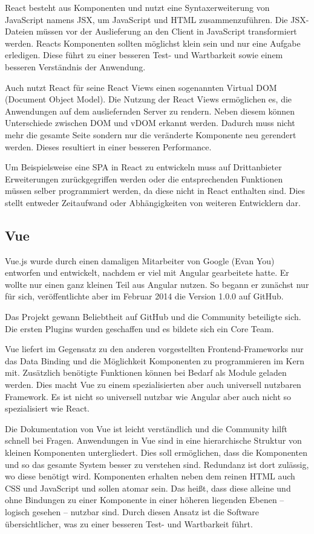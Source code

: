 React besteht aus Komponenten und nutzt eine Syntaxerweiterung von JavaScript namens JSX, um JavaScript und HTML zusammenzuführen. Die JSX-Dateien müssen vor der Auslieferung  an den Client in JavaScript transformiert werden. Reacts Komponenten sollten möglichst klein sein und nur eine Aufgabe erledigen. Diese führt zu einer besseren Test- und Wartbarkeit sowie einem besseren Verständnis der Anwendung. \cite{bezJavaScriptEinfuehrungReact2015}

Auch nutzt React für seine React Views einen sogenannten Virtual DOM (Document Object Model). Die Nutzung der React Views ermöglichen es, die Anwendungen auf dem ausliefernden Server zu rendern. Neben diesem können Unterschiede zwischen DOM und vDOM erkannt werden. Dadurch muss nicht mehr die gesamte Seite sondern nur die veränderte Komponente neu gerendert werden. Dieses resultiert in einer besseren Performance. \cite{bezJavaScriptEinfuehrungReact2015}

Um Beispielsweise eine SPA in React zu entwickeln muss auf Drittanbieter Erweiterungen zurückgegriffen werden oder die entsprechenden Funktionen müssen selber programmiert werden, da diese nicht in React enthalten sind. Dies stellt entweder Zeitaufwand oder Abhängigkeiten von weiteren Entwicklern dar.

\subsection{Vue}
Vue.js wurde durch einen damaligen Mitarbeiter von Google (Evan You) entworfen und entwickelt, nachdem er viel mit Angular gearbeitete hatte. Er wollte nur einen ganz kleinen Teil aus Angular nutzen. So begann er zunächst nur für sich, veröffentlichte aber im Februar 2014 die Version 1.0.0 auf GitHub. \cite{teufelVueJsTutorial2018}

Das Projekt gewann Beliebtheit auf GitHub und die Community beteiligte sich. Die ersten Plugins wurden geschaffen und es bildete sich ein Core Team.

Vue liefert im Gegensatz zu den anderen vorgestellten Frontend-Frameworks nur das Data Binding und die Möglichkeit Komponenten zu programmieren im Kern mit. Zusätzlich benötigte Funktionen können bei Bedarf als Module geladen werden. Dies macht Vue zu einem spezialisierten aber auch universell nutzbaren Framework. Es ist nicht so universell nutzbar wie Angular aber auch nicht so spezialisiert wie React. \cite{teufelVueJsTutorial2018}

Die Dokumentation von Vue ist leicht verständlich und die Community hilft schnell bei Fragen. Anwendungen in Vue sind in eine hierarchische Struktur von kleinen Komponenten untergliedert. Dies soll ermöglichen, dass die Komponenten und so das gesamte System besser zu verstehen sind. Redundanz ist dort zulässig, wo diese benötigt wird.
Komponenten erhalten neben dem reinen HTML auch CSS und JavaScript und sollen atomar sein. Das heißt, dass diese alleine und ohne Bindungen zu einer Komponente in einer höheren liegenden Ebenen -- logisch gesehen -- nutzbar sind. Durch diesen Ansatz ist die Software übersichtlicher, was zu einer besseren Test- und Wartbarkeit führt. \cite{teufelVueJsTutorial2018a}

